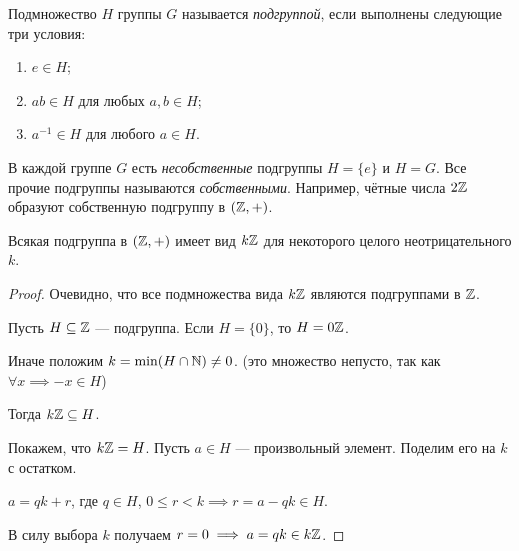 \begin{definition}
    Подмножество $H$ группы $G$ называется \textit{подгруппой}, если выполнены следующие три условия:
    \begin{enumerate}[nosep]
    \item $e \in H$;
    \item $ab \in H$ для любых $a, b \in H$;
    \item $a^{-1} \in H$ для любого $a \in H$.
    \end{enumerate}
\end{definition}

В каждой группе $G$ есть \textit{несобственные} подгруппы $H = \{e\}$ и $H = G$. Все прочие подгруппы называются \textit{собственными}. Например, чётные числа $2\mathbb{Z}$ образуют собственную подгруппу в $(\mathbb{Z}, +)$.

\begin{proposal}
    Всякая подгруппа в $(\mathbb{Z}, +)$ имеет вид $k\mathbb{Z}$ для некоторого целого неотрицательного $k$.
\end{proposal}

\begin{proof}
    Очевидно, что все подмножества вида $k\mathbb{Z}$ являются подгруппами в $\mathbb{Z}$.

    Пусть $H \subseteq \mathbb{Z}$ --- подгруппа. Если $H = \{0\}$, то $H = 0\mathbb{Z}$.
    
    Иначе положим $k = \min(H \cap \mathbb{N}) \neq 0$. (это множество непусто, так как $\forall x \implies -x \in H$)

    Тогда $k\mathbb{Z} \subseteq H$.

    Покажем, что $k\mathbb{Z} = H$. Пусть $a \in H$ --- произвольный элемент. Поделим его на $k$ с остатком.

    $a = qk + r$, где $q \in H$, $0 \leq r < k \implies r = a - qk \in H$.

    В силу выбора $k$ получаем $r = 0 \implies a = qk \in k \mathbb{Z}$.
\end{proof}
